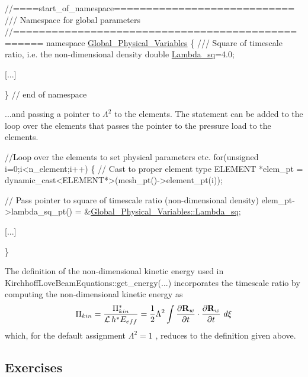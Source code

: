 \begin{DoxyCode}
\textcolor{comment}{//====start\_of\_namespace============================}\textcolor{comment}{}
\textcolor{comment}{/// Namespace for global parameters}
\textcolor{comment}{}\textcolor{comment}{//==================================================}
\textcolor{keyword}{namespace }\hyperlink{namespaceGlobal__Physical__Variables}{Global\_Physical\_Variables}
\{
\textcolor{comment}{}
\textcolor{comment}{ /// Square of timescale ratio, i.e. the non-dimensional density}
\textcolor{comment}{} \textcolor{keywordtype}{double} \hyperlink{namespaceGlobal__Physical__Variables_a6fe17557ceb32dd353827fba60408363}{Lambda\_sq}=4.0;

 [...]

\} \textcolor{comment}{// end of namespace}
\end{DoxyCode}


...and passing a pointer to $ \Lambda^2 $ to the elements. The statement can be added to the loop over the elements that passes the pointer to the pressure load to the elements.


\begin{DoxyCode}
\textcolor{comment}{//Loop over the elements to set physical parameters etc.}
\textcolor{keywordflow}{for}(\textcolor{keywordtype}{unsigned} i=0;i<n\_element;i++)
 \{
  \textcolor{comment}{// Cast to proper element type}
  ELEMENT *elem\_pt = \textcolor{keyword}{dynamic\_cast<}ELEMENT*\textcolor{keyword}{>}(mesh\_pt()->element\_pt(i));
  
  \textcolor{comment}{// Pass pointer to square of timescale ratio (non-dimensional density)}
  elem\_pt->lambda\_sq\_pt() = &\hyperlink{namespaceGlobal__Physical__Variables_a6fe17557ceb32dd353827fba60408363}{Global\_Physical\_Variables::Lambda\_sq};

  [...]

 \}
\end{DoxyCode}


The definition of the non-\/dimensional kinetic energy used in {\ttfamily Kirchhoff\+Love\+Beam\+Equations\+::get\+\_\+energy}(...) incorporates the timescale ratio by computing the non-\/dimensional kinetic energy as \[ \Pi_{kin} = \frac{\Pi_{kin}^*}{{\cal L} \, h^* E_{eff}} = \frac{1}{2} \Lambda^2 \int \frac{\partial {\bf R}_w}{\partial t} \cdot \frac{\partial {\bf R}_w}{\partial t} \ d \xi \] which, for the default assignment $ \Lambda^2 = 1 $ , reduces to the definition given above. 

\hypertarget{index_exercises}{}\subsection{Exercises}\label{index_exercises}

